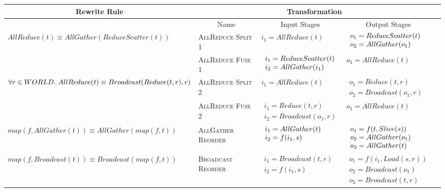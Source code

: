\begin{table}
  \small
    \begin{tabular}[]{|l|l|l|l|l|}
      \hline
      \multicolumn{1}{|c|}{Rewrite Rule} & \multicolumn{3}{c|}{Transformation}\\ \hline
      &\multicolumn{1}{c|}{Name} & \multicolumn{1}{c|}{Input Stages}  & \multicolumn{1}{c|}{Output Stages} \\ \cline{2-4}
    \multirow{2}{*}{$AllReduce(t)\equiv AllGather(ReduceScatter(t))$}
        &\textsc{AllReduce Split 1}  &$i_1 = AllReduce(t)$
        &$\begin{array}{l}o_1 = ReduceScatter(t)\\ 
          o_2 = AllGather(o_1)\end{array}$\\ \cline{2-4}
        & \textsc{AllReduce Fuse 1} & 
          $\begin{array}{l}i_1 = ReduceScatter(t)\\
            i_2 = AllGather(i_1)\end{array}$ & $o_1 = AllReduce(t)$\\\hline
          \multirow{2}{*}{$\forall r \in WORLD.~ AllReduce(t) \equiv Broadcast(Reduce(t, r), r)$}
        &\textsc{AllReduce Split 2} &$i_1 = AllReduce(t)$ &  
        $\begin{array}{l}o_1 = Reduce(t, r)\\ 
        o_2 = Broadcast(o_1, r)\end{array}$\\\cline{2-4}
        & \textsc{AllReduce Fuse 2} & 
        $\begin{array}{l}i_1 = Reduce(t, r)\\ 
          i_2 = Broadcast(o_1, r)\end{array}$ & $o_1 = AllReduce(t)$\\\hline
    $map(f, AllGather(t)) \equiv AllGather(map(f, t))$ & \textsc{AllGather Reorder} &$\begin{array} {lcl}i_1 = AllGather(t)  
    \\i_2 = f(i_1, s) \end{array}$ &  $\begin{array} {lcl} o_1 = f(t, Slice(s)) 
    \\o_2 = AllGather(o_1) \\ 
    o_3 = AllGather(t) \end{array}$\\ \hline
    $map(f, Broadcast(t))\equiv Broadcast(map(f, t))$ & \textsc{Broadcast Reorder} & $\begin{array} {lcl} i_1 = Broadcast(t, r)  
      \\ i_2 = f(i_1, s)\end{array}$  & $\begin{array} {lcl} o_1 = f(i_1, Load(s, r))  
      \\ o_2 = Broadcast(o_1) \\ 
       o_3 = Broadcast(t, r)\end{array}$\\\hline
    \end{tabular}


\end{table}
